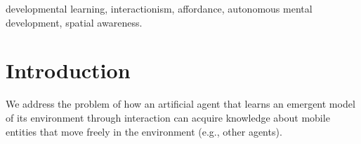 \documentclass[conference]{IEEEtran}
\begin{document}
\begin{IEEEkeywords}
developmental learning, interactionism, affordance, autonomous mental development, spatial awareness.
\end{IEEEkeywords}

\section{Introduction}\label{intro}

We address the problem of how an artificial agent that learns an emergent model of its environment through interaction can acquire knowledge about mobile entities that move freely in the environment (e.g., other agents).
\end{document}
